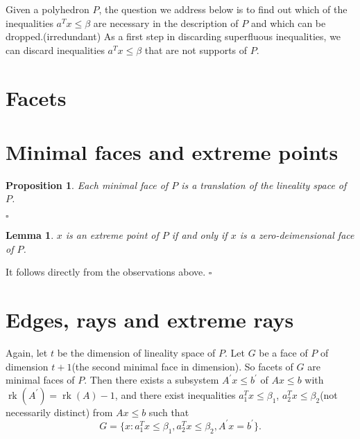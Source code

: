 \documentclass{article}
\DeclareMathOperator{\rk}{rk}
\newtheorem{lemma}[theorem]{Lemma}
\newtheorem{proposition}[theorem]{Proposition}
\newenvironment{proof}{{\it Proof.}}{ \hfill $\square$}
\begin{document}
Given a polyhedron $P$, the question we address below is to find out which of the inequalities $a^T x\leqslant \beta$ are necessary in the description of $P$ and which can be dropped.(irredundant)
As a first step in discarding superfluous inequalities, we can  discard inequalities $a^T x\leqslant \beta$ that are not supports of $P$.

\section{Facets}


\section{Minimal faces and extreme points}

\begin{proposition}
Each minimal face of $P$ is a translation of the lineality space of $P$.
\end{proposition}
\begin{proof}
\end{proof}


\begin{lemma}
$x$ is an extreme point of $P$ if and only if $x$ is a zero-deimensional face of $P$.
\end{lemma}
\begin{proof}
It follows directly from the observations above.
\end{proof}

\section{Edges, rays and extreme rays}
Again, let $t$ be the dimension of lineality space of $P$. Let $G$ be a face of $P$ of dimension $t+1$(the second minimal face in dimension). So facets of $G$ are minimal faces of $P$. Then there exists a subsystem $A^\prime x\leqslant b^\prime$ of $Ax\leqslant b$ with $\rk(A^\prime)=\rk(A)-1$, and there exist inequalities $a_1^T x\leqslant \beta_1$, $a_2^T x\leqslant \beta_2$(not necessarily distinct) from $Ax\leqslant b$ such that
$$G=\{x:a_1^T x\leqslant \beta_1, a_2^T x\leqslant \beta_2, A^\prime x=b^\prime\}.$$
\end{document}
